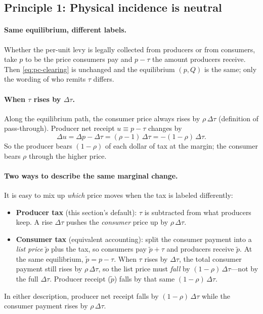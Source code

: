 \documentclass[11pt]{article}
\begin{document}
\subsection{Principle 1: Physical incidence is neutral}

\paragraph{Same equilibrium, different labels.}
Whether the per-unit levy is legally collected from producers or from
consumers, take $p$ to be the price consumers pay and $p-\tau$ the amount
producers receive.  Then \eqref{eq:pc-clearing} is unchanged and the
equilibrium $(p,Q)$ is the same; only the wording of who remits $\tau$
differs.

\paragraph{When $\tau$ rises by $\Delta\tau$.}
Along the equilibrium path, the consumer price always rises by
$\rho\,\Delta\tau$ (definition of pass-through).  Producer net receipt
$u \equiv p-\tau$ changes by
\[
  \Delta u = \Delta p - \Delta\tau = (\rho-1)\,\Delta\tau = -(1-\rho)\,\Delta\tau.
\]
So the producer bears $(1-\rho)$ of each dollar of tax at the margin; the
consumer bears $\rho$ through the higher price.

\paragraph{Two ways to describe the same marginal change.}
It is easy to mix up \emph{which} price moves when the tax is labeled
differently:
\begin{itemize}
  \item \textbf{Producer tax} (this section's default): $\tau$ is subtracted
    from what producers keep.  A rise $\Delta\tau$ pushes the \emph{consumer}
    price up by $\rho\,\Delta\tau$.
  \item \textbf{Consumer tax} (equivalent accounting): split the consumer
    payment into a \emph{list price} $\tilde p$ plus the tax, so consumers
    pay $\tilde p+\tau$ and producers receive $\tilde p$.  At the same
    equilibrium, $\tilde p = p-\tau$.  When $\tau$ rises by $\Delta\tau$,
    the total consumer payment still rises by $\rho\,\Delta\tau$, so the
    list price must \emph{fall} by $(1-\rho)\,\Delta\tau$---not by the
    full $\Delta\tau$.  Producer receipt ($\tilde p$) falls by that same
    $(1-\rho)\,\Delta\tau$.
\end{itemize}
In either description, producer net receipt falls by $(1-\rho)\,\Delta\tau$
while the consumer payment rises by $\rho\,\Delta\tau$.
\end{document}

